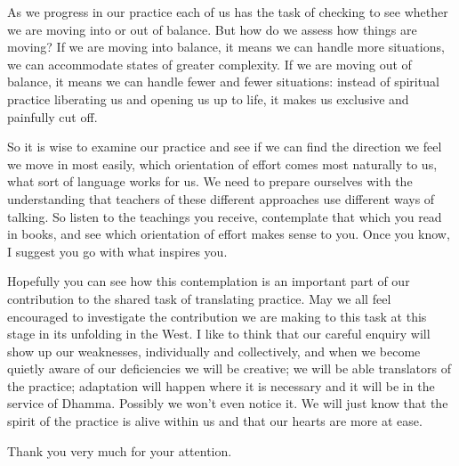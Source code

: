 As we progress in our practice each of us has the task of checking to
see whether we are moving into or out of balance. But how do we assess
how things are moving? If we are moving into balance, it means we can
handle more situations, we can accommodate states of greater complexity.
If we are moving out of balance, it means we can handle fewer and fewer
situations: instead of spiritual practice liberating us and opening us
up to life, it makes us exclusive and painfully cut off.

So it is wise to examine our practice and see if we can find the
direction we feel we move in most easily, which orientation of effort
comes most naturally to us, what sort of language works for us. We need
to prepare ourselves with the understanding that teachers of these
different approaches use different ways of talking. So listen to the
teachings you receive, contemplate that which you read in books, and see
which orientation of effort makes sense to you. Once you know, I suggest
you go with what inspires you.

\sectionBreak

Hopefully you can see how this contemplation is an important part of our
contribution to the shared task of translating practice. May we all feel
encouraged to investigate the contribution we are making to this task at
this stage in its unfolding in the West. I like to think that our careful
enquiry will show up our weaknesses, individually and collectively, and
when we become quietly aware of our deficiencies we will be
creative; we will be able translators of the practice; adaptation will
happen where it is necessary and it will be in the service of Dhamma.
Possibly we won't even notice it. We will just know that the spirit of
the practice is alive within us and that our hearts are more at ease.

Thank you very much for your attention.

